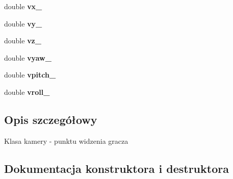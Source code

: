 \begin{DoxyCompactItemize}
\item 
double {\bfseries vx\+\_\+}\hypertarget{class_camera_a7383b28a310ea2664874fbabe5e66e38}{}\label{class_camera_a7383b28a310ea2664874fbabe5e66e38}

\item 
double {\bfseries vy\+\_\+}\hypertarget{class_camera_aba5e551b383324cf19e4dfdff103229a}{}\label{class_camera_aba5e551b383324cf19e4dfdff103229a}

\item 
double {\bfseries vz\+\_\+}\hypertarget{class_camera_ae5770bf3fd53854d5dd9cdcbc18fdab3}{}\label{class_camera_ae5770bf3fd53854d5dd9cdcbc18fdab3}

\item 
double {\bfseries vyaw\+\_\+}\hypertarget{class_camera_af5a43904926f58b8fe1b3da391cdc9ea}{}\label{class_camera_af5a43904926f58b8fe1b3da391cdc9ea}

\item 
double {\bfseries vpitch\+\_\+}\hypertarget{class_camera_a0edd07cc2b7b294fddaf29dec22fc63a}{}\label{class_camera_a0edd07cc2b7b294fddaf29dec22fc63a}

\item 
double {\bfseries vroll\+\_\+}\hypertarget{class_camera_ad356a82282afe866ebf827eef7b9e1b3}{}\label{class_camera_ad356a82282afe866ebf827eef7b9e1b3}

\end{DoxyCompactItemize}


\subsection{Opis szczegółowy}
Klasa kamery -\/ punktu widzenia gracza 

\subsection{Dokumentacja konstruktora i destruktora}
